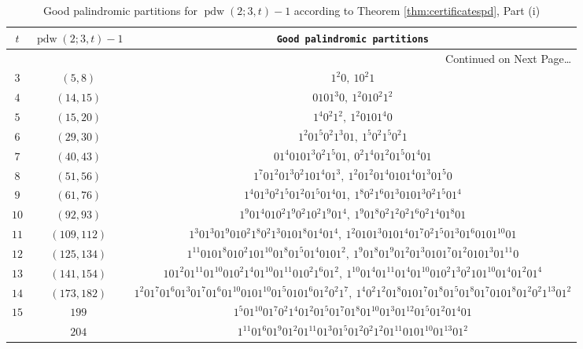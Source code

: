 \documentclass[final,3p,times]{elsarticle}
\theoremstyle{definition}
\DeclareMathOperator{\vdwpd}{pdw}
\begin{document}
\begin{appendix}
{
\scriptsize
\renewcommand{\arraystretch}{2}
\begin{longtable}[c]{|c|c|c|}
\caption{Good palindromic partitions for $\vdwpd(2; 3, t)-1$ according to Theorem \ref{thm:certificatespd}, Part (i)}
\label{tab-pal}\\
  \hline \hline
 $t$ & $\vdwpd(2;3,t)-1$ &{\tt Good palindromic partitions}\\
  \hline
\endhead
\hline
  \multicolumn{3}{|r|}{{Continued on Next Page\ldots}} \\
\hline
\endfoot
\endlastfoot
$3$ & $(5,8)$ & $1^{2}0, \ 10^{2}1$\\
\hline
$4$ & $(14,15)$ & $0101^{3}0, \ 1^{2}010^{2}1^{2}$\\
\hline
$5$ & $(15,20)$ & $1^{4}0^{2}1^{2}, \ 1^{2}0101^{4}0$\\
\hline
$6$ & $(29,30)$ & $1^{2}01^{5}0^{2}1^{3}01, \ 1^{5}0^{2}1^{5}0^{2}1$\\
\hline
$7$ & $(40,43)$ & $01^{4}0101^{3}0^{2}1^{5}01, \ 0^{2}1^{4}01^{2}01^{5}01^{4}01$\\
\hline
$8$ & $(51,56)$ & $1^{7}01^{2}01^{3}0^{2}101^{4}01^{3}, \ 1^{2}01^{2}01^{4}0101^{4}01^{3}01^{5}0$\\
\hline
$9$ & $(61,76)$ & $1^{4}01^{3}0^{2}1^{5}01^{2}01^{5}01^{4}01, \ 1^{8}0^{2}1^{6}01^{3}0101^{3}0^{2}1^{5}01^{4}$\\
\hline
$10$ & $(92,93)$ & $1^{9}01^{4}010^{2}1^{9}0^{2}10^{2}1^{9}01^{4}, \ 1^{9}01^{8}0^{2}1^{2}0^{2}1^{6}0^{2}1^{4}01^{8}01$\\
\hline
$11$ & $(109,112)$ & $1^{3}01^{3}01^{9}010^{2}1^{8}0^{2}1^{3}0101^{8}01^{4}01^{4}, \ 1^{2}0101^{3}0101^{4}01^{7}0^{2}1^{5}01^{3}01^{6}0101^{10}01$\\
\hline
$12$ & $(125,134)$ & $1^{11}0101^{8}010^{2}101^{10}01^{8}01^{5}01^{4}0101^{2}, \ 1^{9}01^{8}01^{9}01^{2}01^{3}0101^{7}01^{2}0101^{3}01^{11}0$\\
\hline
$13$ & $(141,154)$ & $101^{2}01^{11}01^{10}010^{2}1^{4}01^{10}01^{11}010^{2}1^{6}01^{2}, \ 1^{10}01^{4}01^{11}01^{4}01^{10}010^{2}1^{3}0^{2}101^{10}01^{4}01^{2}01^{4}$\\
\hline
$14$ & $(173,182)$ & $1^{2}01^{7}01^{6}01^{3}01^{7}01^{6}01^{10}0101^{10}01^{5}0101^{6}01^{2}0^{2}1^{7}, \ 1^{4}0^{2}1^{2}01^{8}0101^{7}01^{8}01^{5}01^{8}01^{7}0101^{8}01^{2}0^{2}1^{13}01^{2}$\\
\hline
$15$ & $199$ & $1^{5}01^{10}01^{7}0^{2}1^{4}01^{2}01^{5}01^{7}01^{8}01^{10}01^{3}01^{12}01^{5}01^{2}01^{4}01$\\[-1ex]
& $204$ & $1^{11}01^{6}01^{9}01^{2}01^{11}01^{3}01^{5}01^{2}0^{2}1^{2}01^{11}0101^{10}01^{13}01^{2}$\\

\end{longtable}}
\end{appendix}
\end{document}
